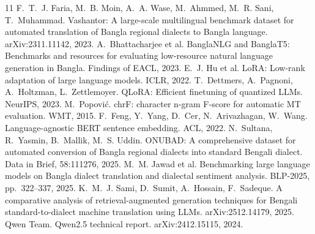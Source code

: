 \documentclass[10pt,twocolumn]{article}
\begin{document}
{\small
\begin{thebibliography}{11}
 F.~T.~J. Faria, M.~B. Moin, A.~A. Wase, M.~Ahmmed, M.~R. Sani, T.~Muhammad. Vashantor: A
large-scale multilingual benchmark dataset for automated translation of Bangla regional dialects to Bangla
language. arXiv:2311.11142, 2023.
 A.~Bhattacharjee et al. BanglaNLG and BanglaT5: Benchmarks and resources for evaluating
low-resource natural language generation in Bangla. Findings of EACL, 2023.
 E.~J. Hu et al. LoRA: Low-rank adaptation of large language models. ICLR, 2022.
 T.~Dettmers, A.~Pagnoni, A.~Holtzman, L.~Zettlemoyer. QLoRA: Efficient finetuning of quantized
LLMs. NeurIPS, 2023.
 M.~Popović. chrF: character n-gram F-score for automatic MT evaluation. WMT, 2015.
 F.~Feng, Y.~Yang, D.~Cer, N.~Arivazhagan, W.~Wang. Language-agnostic BERT sentence embedding.
ACL, 2022.
 N.~Sultana, R.~Yasmin, B.~Mallik, M.~S. Uddin. ONUBAD: A comprehensive dataset for automated
conversion of Bangla regional dialects into standard Bengali dialect. Data in Brief, 58:111276, 2025.
 M.~M. Jawad et al. Benchmarking large language models on Bangla dialect translation and
dialectal sentiment analysis. BLP-2025, pp.~322--337, 2025.
 K.~M.~J. Sami, D.~Sumit, A.~Hossain, F.~Sadeque. A comparative analysis of retrieval-augmented
generation techniques for Bengali standard-to-dialect machine translation using LLMs. arXiv:2512.14179, 2025.
 Qwen Team. Qwen2.5 technical report. arXiv:2412.15115, 2024.
\end{thebibliography}}
\end{document}
